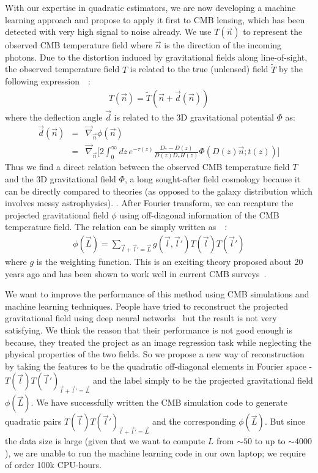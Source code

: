 \documentclass[12pt]{article}
\begin{document}
\begin{small}
With our expertise in quadratic estimators, we are now developing a machine learning approach and propose to apply it first to CMB lensing, which has been detected with very high signal to noise already.
We use $T(\vec{n})$ to represent the observed CMB temperature field where $\vec{n}$ is the direction of the incoming photons. Due to the distortion induced by gravitational fields along line-of-sight, the observed temperature field $T$ is related to the true (unlensed) field $\tilde{T}$ by the following expression~\cite{Hu:2001tn}~\cite{Li:2019qkp}:
\begin{eqnarray}
T(\vec{n})=\tilde{T}(\vec{n}+\vec{d}(\vec{n}))
\end{eqnarray}
where the deflection angle $\vec{d}$ is related to the 3D gravitational potential $\Phi$ as:
\begin{eqnarray}
\vec{d}(\vec{n})&=& \vec{\nabla}_{\vec{n}} {\phi}(\vec{n})\nonumber \\
&=&\vec{\nabla}_{\vec{n}}\bigg[ 2\int_{0}^{\infty} dz\, e^{-\tau(z)}\frac{D_{*}-D(z)}{D(z)D_{*}H(z)}\Phi(D(z)\vec{n};t(z)) \bigg]
\end{eqnarray}
Thus we find a direct relation between the observed CMB temperature field $T$ and the 3D gravitational field $\Phi$, a long sought-after field cosmology because it can be directly compared to theories (as opposed to the galaxy distribution which involves messy astrophysics). . After Fourier transform, we can recapture the projected gravitational field $\phi$ using off-diagonal information of the CMB temperature field. The relation can be simply written as~\cite{Hu:2001kj}~\cite{Okamoto:2003zw}:
\begin{eqnarray}
\phi(\vec{L}) = \sum_{\vec{l}+\vec{l}'=\vec{L}}g(\vec{l},\vec{l}')  T(\vec{l})T(\vec{l}')
\end{eqnarray}
where $g$ is the weighting function. This is an exciting theory proposed about 20 years ago and has been shown to work well in current CMB surveys~\cite{Aghanim:2018oex}. 


We want to improve the performance of this method using CMB simulations and machine learning techniques. People have tried to reconstruct the projected gravitational field using deep neural networks~\cite{Caldeira:2018ojb} but the result is not very satisfying. We think the reason that their performance is not good enough is because, they treated the project as an image regression task while neglecting the physical properties of the two fields. So we propose a new way of reconstruction by taking the features to be the quadratic off-diagonal elements in Fourier space - $T(\vec{l})T(\vec{l}')_{\vec{l}+\vec{l}'=\vec{L}}$ and the label simply to be the projected gravitational field $\phi(\vec{L})$. We have successfully written the CMB simulation code to generate quadratic pairs $T(\vec{l})T(\vec{l}')_{\vec{l}+\vec{l}'=\vec{L}}$ and the corresponding $\phi(\vec{L})$. But since the data size is large (given that we want to compute $L$ from $\sim 50$ to up to $\sim 4000$), we are unable to run the machine learning code in our own laptop; we require of order 100k CPU-hours.


\end{small}
\end{document}
